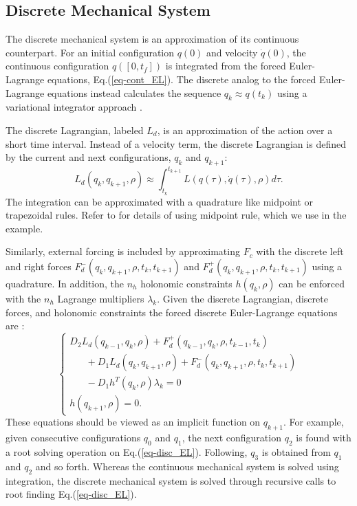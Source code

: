 \documentclass[letterpaper, 10pt, conference]{ieeeconf}
\begin{document}
\subsection{Discrete Mechanical System}
The discrete mechanical system is an approximation of its continuous counterpart.  For an initial configuration $q(0)$ and velocity $\dot{q}(0)$, the continuous configuration $q([0,t_f])$ is integrated from the forced Euler-Lagrange equations, Eq.(\ref{eq-cont_EL}).  The discrete analog to the forced Euler-Lagrange equations instead calculates the sequence $q_k\approx q(t_k)$ using a variational integrator approach \cite{johnson_murphey_scalable}.  

The discrete Lagrangian, labeled $L_d$, is an approximation of the action over a short time interval.  Instead of a velocity term, the discrete Lagrangian is defined by the current and next configurations, $q_k$ and $q_{k+1}$:
\begin{equation}
L_d(q_k,q_{k+1},\rho) \approx \int_{t_k}^{t_{k+1}}L(q(\tau),\dot{q}(\tau),\rho)d\tau.
\label{eq-Ld}
\end{equation}
The integration can be approximated with a quadrature like midpoint or trapezoidal rules.  Refer to \cite{johnson_murphey_scalable} for details of using midpoint rule, which we use in the example.  

Similarly, external forcing is included by approximating $F_c$ with the discrete left and right forces $F_d^-(q_k,q_{k+1},\rho,t_k,t_{k+1})$ and $F_d^+(q_k,q_{k+1},\rho,t_k,t_{k+1})$ using a quadrature.  In addition, the $n_h$ holonomic constraints $h(q_k,\rho)$ can be enforced with the $n_h$ Lagrange multipliers $\lambda_k$.  Given the discrete Lagrangian, discrete forces, and holonomic constraints the forced discrete Euler-Lagrange equations are \cite{johnson_murphey_scalable}:
\begin{equation}
\left\{\begin{array}{l}
D_2 L_d(q_{k-1},q_{k},\rho) + F_d^+(q_{k-1},q_{k},\rho,t_{k-1},t_{k}) \\\hspace{20pt}+ D_1L_d(q_k,q_{k+1},\rho) + F_d^-(q_k,q_{k+1},\rho,t_k,t_{k+1}) \\\hspace{20pt} - D_1h^T(q_k,\rho)\lambda_k= 0 \\
\hspace{0pt}h(q_{k+1},\rho) = 0.
\end{array}
\right.
\label{eq-disc_EL}
\end{equation}
These equations should be viewed as an implicit function on $q_{k+1}$.  For example, given consecutive configurations $q_0$ and $q_1$, the next configuration $q_2$ is found with a root solving operation on Eq.(\ref{eq-disc_EL}). Following, $q_3$ is obtained from $q_1$ and $q_2$ and so forth.  Whereas the continuous mechanical system is solved using integration, the discrete mechanical system is solved through recursive calls to root finding Eq.(\ref{eq-disc_EL}). 
\end{document}
